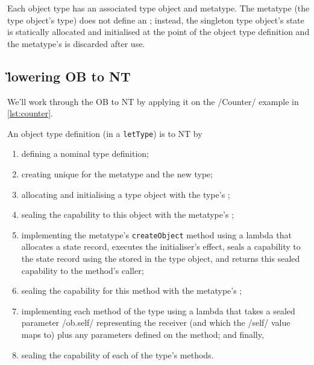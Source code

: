 \documentclass[main.tex]{subfiles}
\begin{document}
Each object type has an associated type object and metatype. The metatype (the type object's type) does not define an ; instead, the singleton type object's state is statically allocated and initialised at the point of the object type definition and the metatype's  is discarded after use.

\subsection{\G{lowering} OB to NT}
We'll work through the OB to NT  by applying it on the \iil/Counter/ example in \cref{lst:counter}.

An object type definition (in a \texttt{letType}) is \lowered{} to NT by
\begin{enumerate}[nosep]
	
	\item defining a nominal type definition;
	
	\item creating unique  for the metatype and the new type;
	
	\item allocating and initialising a type object with the type's ;
	\item sealing the capability to this object with the metatype's ;
	
	\item implementing the metatype's \texttt{createObject} method using a lambda that allocates a state record, executes the initialiser's effect, seals a capability to the state record using the  stored in the type object, and returns this sealed capability to the method's caller;
	\item sealing the capability for this method with the metatype's ;
	
	\item implementing each method of the type using a lambda that takes a sealed parameter \iil/ob.self/ representing the receiver (and which the \iil/self/ value maps to) plus any parameters defined on the method; and finally,
	\item sealing the capability of each of the type's methods.
	
\end{enumerate}
\end{document}
